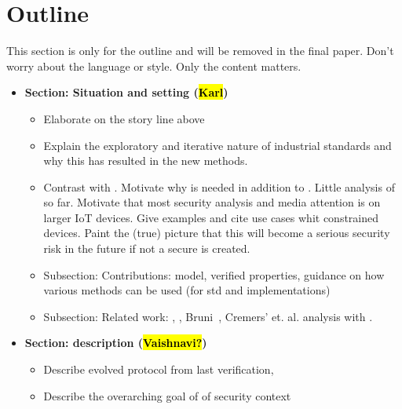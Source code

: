 \documentclass[runningheads]{llncs}
\begin{document}
{\color{blue}
\section*{Outline}
This section is only for the outline and will be removed in the final
    paper. Don't worry about the language or style. Only the content matters.
\vspace{10pt}

\begin{itemize}
    \item \textbf{Section: Situation and setting (\hl{Karl})}
        \begin{itemize}
            \item Elaborate on the story line above
            \item Explain the exploratory and iterative nature of industrial
                  standards and why this has resulted in the new \mStat methods.
            \item Contrast with \mTls. Motivate why \mEdhoc is needed in
                addition to \mTls. Little analysis of \mEdhoc so far.
                Motivate that most security analysis and media attention is on
                larger IoT devices. Give examples and cite use cases whit
                constrained devices. Paint the (true) picture that this will
                become a serious security risk in the future if not a secure
                \mEdhoc is created.
            \item Subsection: Contributions: model, verified properties,
                guidance on how various methods can be used (for std and
                implementations)
            \item Subsection: Related work: \mOptls, \mNoise,
                Bruni~\cite{DBLP:conf/secsr/BruniJPS18}, Cremers' et. al. \mTls
                analysis with \mTamarin.
        \end{itemize}
    \item \textbf{Section: \mEdhoc description (\hl{Vaishnavi?})}
        \begin{itemize}
            \item Describe evolved protocol from last \mEdhoc verification,
            \item Describe the overarching goal of \mEdhoc of security context

\end{itemize}
\end{itemize}}
\end{document}
